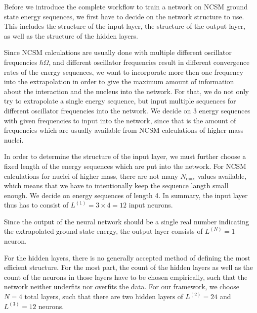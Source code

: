 Before we introduce the complete workflow to train a network on NCSM ground state energy sequences, we first have to decide on the network structure to use.
This includes the structure of the input layer, the structure of the output layer, as well as the structure of the hidden layers.

Since NCSM calculations are usually done with multiple different oscillator frequencies $\hbar \Omega$, and different oscillator frequencies result in different convergence rates of the energy sequences, we want to incorporate more then one frequency into the extrapolation in order to give the maximum amount of information about the interaction and the nucleus into the network.
For that, we do not only try to extrapolate a single energy sequence, but input multiple sequences for different oscillator frequencies into the network.
We decide on 3 energy sequences with given frequencies to input into the network, since that is the amount of frequencies which are usually available from NCSM calculations of higher-mass nuclei.

In order to determine the structure of the input layer, we must further choose a fixed length of the energy sequences which are put into the network.
For NCSM calculations for nuclei of higher mass, there are not many $N_\mathrm{max}$ values available, which means that we have to intentionally keep the sequence langth small enough.
We decide on energy sequences of length 4.
In summary, the input layer thus has to consist of $L^{(1)} = 3\times 4 = 12$ input neurons.

Since the output of the neural network should be a single real number indicating the extrapolated ground state energy, the output layer consists of $L^{(N)} = 1$ neuron.

For the hidden layers, there is no generally accepted method of defining the most efficient structure. For the most part, the count of the hidden layers as well as the count of the neurons in those layers have to be chosen empirically, such that the network neither underfits nor overfits the data. For our framework, we choose $N = 4$ total layers, such that there are two hidden layers of $L^{(2)} = 24$ and $L^{(3)} = 12$ neurons.
